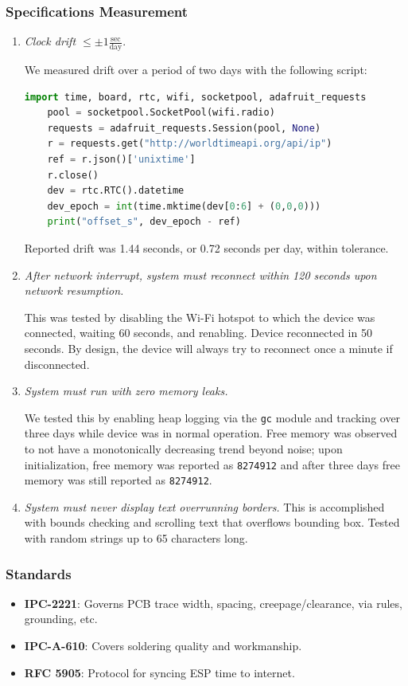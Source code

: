 \subsubsection{Specifications Measurement}
\begin{enumerate}
    \item \emph{Clock drift $\leq \pm 1\frac{\text{sec}}{\text{day}}$}.

          We measured drift over a period of two days with the following script:
          \begin{lstlisting}[language=Python]
    import time, board, rtc, wifi, socketpool, adafruit_requests
    pool = socketpool.SocketPool(wifi.radio)
    requests = adafruit_requests.Session(pool, None)
    r = requests.get("http://worldtimeapi.org/api/ip")
    ref = r.json()['unixtime']
    r.close()
    dev = rtc.RTC().datetime 
    dev_epoch = int(time.mktime(dev[0:6] + (0,0,0))) 
    print("offset_s", dev_epoch - ref)
    \end{lstlisting}
          Reported drift was 1.44 seconds, or 0.72 seconds per day, within tolerance.
    \item \emph{After network interrupt, system must reconnect within 120 seconds upon network resumption.}

          This was tested by disabling the Wi-Fi hotspot to which the device was
          connected, waiting 60 seconds, and renabling. Device reconnected in 50 seconds.
          By design, the device will always try to reconnect once a minute if disconnected.
    \item \emph{System must run with zero memory leaks.}

          We tested this by enabling heap logging via the \texttt{gc} module and tracking over
          three days while device was in normal operation. Free memory
          was observed to not have a monotonically decreasing trend beyond noise;
          upon initialization, free memory was reported as
          \texttt{8274912} and after three days free memory was still
          reported as \texttt{8274912}.
    \item \emph{System must never display text overrunning borders.}
          This is accomplished with bounds checking and scrolling text that
          overflows bounding box. Tested with random strings up to
          65 characters long.
\end{enumerate}

\subsubsection{Standards}
\begin{itemize}
    \item \textbf{IPC-2221}: Governs PCB trace width, spacing, creepage/clearance, via rules, grounding, etc.
    \item \textbf{IPC-A-610}: Covers soldering quality and workmanship.
    \item \textbf{RFC 5905}: Protocol for syncing ESP time to internet.
\end{itemize}